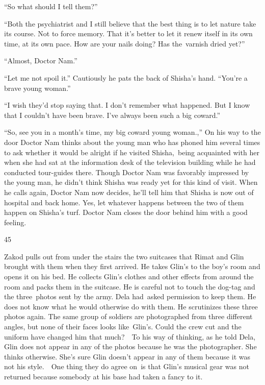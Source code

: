\documentclass[twoside,11pt]{book}
\begin{document}
``So what should I tell them?'' 

``Both the psychiatrist and I still believe that the best thing is to let nature take its course. Not to
force memory. That it's better to let it renew itself in its own time, at its own pace. How are your nails doing? Has
the~varnish dried yet?'' 

``Almost, Doctor Nam.'' 

``Let me not spoil it.'' Cautiously he pats the back of Shisha's hand. ``You're a
brave young woman.'' 

``I wish they'd stop saying that. I don't remember what happened. But I know that I couldn't have been
brave. I've always been such a big coward.'' 

``So, see you in a month's time, my big coward young woman.,'' On his way to the door Doctor
Nam thinks about the young man who has phoned him several times to ask whether it would be alright if he visited
Shisha,\ being acquainted with her when she had sat at the information desk of the television building while he had
conducted tour-guides there. Though Doctor Nam was favorably impressed by the young man, he didn't think Shisha was
ready yet for this kind of visit. When he calls again, Doctor Nam now decides, he'll tell him that Shisha is now out of
hospital and back home. Yes, let whatever happens between the two of them happen on Shisha's turf. Doctor Nam closes
the door behind him with a good feeling.\ 


\bigskip

45\ \ 

Zakod pulls out from under the stairs the two suitcases that Rimat and Glin brought with them when they first arrived.
He takes Glin's to the boy's room and opens it on his bed. He collects Glin's clothes and other effects from around the
room and packs them in the suitcase. He is careful not to touch the dog-tag and the three~photos sent by the army. Dela
had~asked permission to keep them. He does not know what he would otherwise do with them. He scrutinizes these three
photos again. The same group of soldiers are photographed from three different angles, but none of their faces looks
like\ Glin's. Could the crew cut and the uniform have changed him that much?\ \ To his way of thinking, as he told
Dela, Glin does not appear in any of the photos because he was the photographer. She thinks otherwise. She's sure Glin
doesn't appear in any of them because it was not his style.\ \ One thing they do agree on\ is that Glin's musical gear
was not returned because somebody at his base had taken a fancy to it. 
\end{document}
